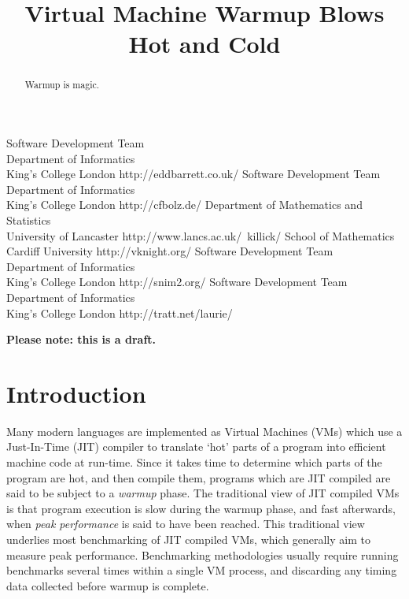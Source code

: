 \documentclass[10pt,preprint]{sigplanconf}
\begin{document}
\title{Virtual Machine Warmup Blows Hot and Cold}
           {Software Development Team\\ Department of Informatics\\ King's College London}
           {http://eddbarrett.co.uk/}
           {Software Development Team\\ Department of Informatics\\ King's College London}
           {http://cfbolz.de/}
           {Department of Mathematics and Statistics\\ University of Lancaster}
           {http://www.lancs.ac.uk/~killick/}
           {School of Mathematics\\ Cardiff University}
           {http://vknight.org/}
           {Software Development Team\\ Department of Informatics\\ King's College London}
           {http://snim2.org/}
           {Software Development Team\\ Department of Informatics\\ King's College London}
           {http://tratt.net/laurie/}
\maketitle

\noindent\textbf{Please note: this is a draft.}

\begin{abstract}
Warmup is magic.
\end{abstract}

\section{Introduction}
\label{sec:intro}



Many modern languages are implemented as Virtual Machines (VMs) which use a
Just-In-Time (JIT) compiler to translate `hot' parts of a program into efficient
machine code at run-time. Since it takes time to determine which parts of the
program are hot, and then compile them, programs which are JIT compiled are
said to be subject to a \emph{warmup} phase. The traditional view of
JIT compiled VMs is that program execution is slow during the warmup phase, and
fast afterwards, when \emph{peak performance} is said to have been reached.
This traditional view underlies most benchmarking of JIT compiled VMs, which
generally aim to measure peak performance. Benchmarking methodologies usually
require running benchmarks several times within a single VM process, and
discarding any timing data collected before warmup is complete.
\end{document}
